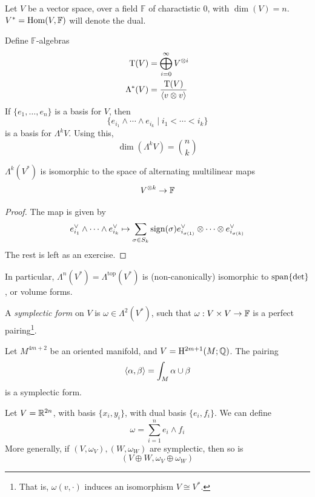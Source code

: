\documentclass{article}
\begin{document}
Let \(V\) be a vector space, over a field \(\mathbb F\) of charactistic 0, with \(\dim(V) = n\). \(V^* = \operatorname{Hom}(V, \mathbb F)\) will denote the dual.

Define \(\mathbb F\)-algebras
\begin{align*}
    \mathrm{T}(V) &= \bigoplus_{i=0}^\infty V^{\otimes i} \\
    \Lambda^*(V) &= \frac{\mathrm{T}(V)}{\left\langle v \otimes v \right\rangle}
\end{align*}
If \(\{e_1, \dots, e_n\}\) is a basis for \(V\), then
\[\{e_{i_1} \wedge \cdots \wedge e_{i_k} \mid i_1 < \cdots < i_k\}\]
is a basis for \(\Lambda^kV\). Using this,
\[\dim(\Lambda^kV) = {n \choose k}\]

\begin{proposition}
    \(\Lambda^k(V^*)\) is isomorphic to the space of alternating multilinear maps
    \[V^{\otimes k} \to \mathbb{F}\]
\end{proposition}

\begin{proof}
    The map is given by
    \[e_{i_1}^\vee\wedge \cdots \wedge e_{i_k}^\vee \mapsto \sum_{\sigma \in S_k}\operatorname{sign}(\sigma)e_{i_{\sigma(1)}}^\vee\otimes \cdots \otimes e_{i_{\sigma(k)}}^\vee\]
    The rest is left as an exercise.
\end{proof}

In particular, \(\Lambda^n(V^*) = \Lambda^{\text{top}}(V^*)\) is (non-canonically) isomorphic to \(\operatorname{span}\{\det\}\), or volume forms.

\begin{definition}
    A \emph{symplectic form} on \(V\) is \(\omega \in \Lambda^2(V^*)\), such that \(\omega : V \times V \to \mathbb{F}\) is a perfect pairing\footnote{That is, \(\omega(v, \cdot)\) induces an isomorphism \(V \cong V^*\).}.
\end{definition}

\begin{example}
    Let \(M^{4m+2}\) be an oriented manifold, and \(V = \mathrm{H}^{2m+1}(M; \mathbb{Q})\). The pairing
    \[\left\langle \alpha, \beta \right\rangle = \int_M\alpha\cup\beta\]
    is a symplectic form.
\end{example}

\begin{example}
    Let \(V = \mathbb{R}^{2n}\), with basis \(\{x_i, y_i\}\), with dual basis \(\{e_i, f_i\}\). We can define
    \[\omega = \sum_{i=1}^n e_i \wedge f_i\]
    More generally, if \((V, \omega_V), (W, \omega_W)\) are symplectic, then so is
    \[(V \oplus W, \omega_V \oplus \omega_W)\]
\end{example}
\end{document}
